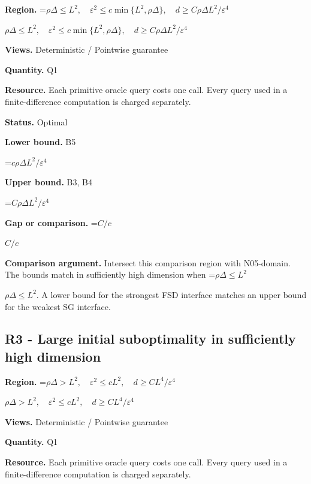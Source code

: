 \documentclass[10pt,a4paper]{article}
\newcommand{\AtlasMath}[1]{\par\begingroup\centering\setbox0=\hbox{$\displaystyle #1$}\ifdim\wd0>1.4\linewidth\typeout{ATLAS WIDE FORMULA: \the\wd0}\fi\ifdim\wd0>\linewidth\resizebox{\linewidth}{!}{\box0}\else\box0\fi\par\endgroup}
\newcommand{\AtlasInlineMath}[1]{\begingroup\setbox0=\hbox{$#1$}\ifdim\wd0>.4\linewidth\endgroup\AtlasMath{#1}\else\endgroup$#1$\fi}
\begin{document}
\textbf{Region.} \AtlasInlineMath{\rho\Delta\le L^2,\quad\varepsilon^2\le c\min\{L^2,\rho\Delta\},\quad d\ge C\rho\Delta L^2/\varepsilon^4}



\textbf{Views.} Deterministic / Pointwise guarantee



\textbf{Quantity.} Q1



\textbf{Resource.} Each primitive oracle query costs one call. Every query used in a finite-difference computation is charged separately.



\textbf{Status.} Optimal



\textbf{Lower bound.} B5



\AtlasMath{c\rho\Delta L^2/\varepsilon^4}


\textbf{Upper bound.} B3, B4



\AtlasMath{C\rho\Delta L^2/\varepsilon^4}


\textbf{Gap or comparison.} \AtlasInlineMath{C/c}



\textbf{Comparison argument.} Intersect this comparison region with N05-domain. The bounds match in sufficiently high dimension when \AtlasInlineMath{\rho\Delta\le L^2}. A lower bound for the strongest FSD interface matches an upper bound for the weakest SG interface.



\subsection{R3 - Large initial suboptimality in sufficiently high dimension}


\textbf{Region.} \AtlasInlineMath{\rho\Delta>L^2,\quad\varepsilon^2\le cL^2,\quad d\ge CL^4/\varepsilon^4}



\textbf{Views.} Deterministic / Pointwise guarantee



\textbf{Quantity.} Q1



\textbf{Resource.} Each primitive oracle query costs one call. Every query used in a finite-difference computation is charged separately.
\end{document}

